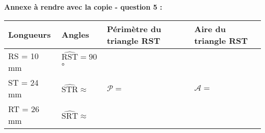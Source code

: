 \vspace{0,5cm}

\textbf{Annexe à rendre avec la copie - question 5 :}

\begin{tabularx}{\linewidth}{|*{4}{>{}X|}} \hline
	\textbf{Longueurs} & \textbf{Angles} & \textbf{Périmètre du triangle RST} & \textbf{Aire du triangle RST}\\ \hline
	
	\rule[-3mm]{0mm}{10mm}RS = 10 mm & $\widehat{\mathrm{RST}} = 90$° & \multirow{3}{*}{\rule{0mm}{12mm}$ \mathcal{P} = $}
	& \multirow{3}{*}{\rule{0mm}{12mm}$ \mathcal{A} = $}
	\\ \cline{1-2}
	\rule[-3mm]{0mm}{10mm}ST = 24 mm & $\widehat{\mathrm{STR}} \approx$ &&\\ \cline{1-2}
	\rule[-3mm]{0mm}{10mm}RT = 26 mm & $\widehat{\mathrm{SRT}} \approx$ &&\\ \hline
	
\end{tabularx}

